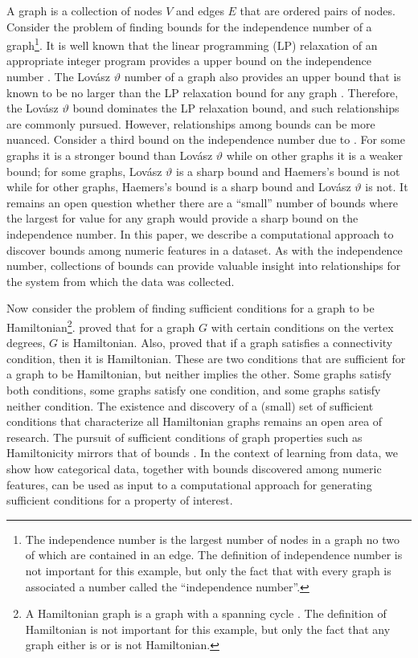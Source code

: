 \documentclass[ijds,nonblindrev]{informs-ijds}
\begin{document}
A graph is a collection of nodes $V$ and edges $E$ that are ordered pairs of nodes.  Consider the problem of finding bounds for the independence number of a graph\footnote{The independence number is the largest number of nodes in a graph no two of which are contained in an edge.  The definition of independence number is not important for this example, but only the fact that with every graph is associated a number called the ``independence number''.}.  It is well known that the linear programming (LP) relaxation of an appropriate integer program provides a upper bound on the independence number \citep{Schr03}.  The Lov\'asz $\vartheta$ number of a graph also provides an upper bound that is known to be no larger than the LP relaxation bound for any graph \citep{Lova79}.  Therefore, the Lov\'asz $\vartheta$ bound dominates the LP relaxation bound, and such relationships are commonly pursued.  However, relationships among bounds can be more nuanced.  Consider a third bound on the independence number due to \citet{Haem79}.  For some graphs it is a stronger bound than Lov\'asz $\vartheta$ while on other graphs it is a weaker bound; for some graphs, Lov\'asz $\vartheta$ is a sharp bound and Haemers's bound is not while for other graphs, Haemers's bound is a sharp bound and Lov\'asz $\vartheta$ is not.  It remains an open question whether there are a ``small'' number of bounds where the largest for value for any graph would provide a sharp bound on the independence number.  In this paper, we describe a computational approach to discover bounds among numeric features in a dataset.  As with the independence number, collections of bounds can provide valuable insight into relationships for the system from which the data was collected.  

Now consider the problem of finding sufficient conditions for a graph to be Hamiltonian\footnote{A Hamiltonian graph is a graph with a spanning cycle \citep{West01}.  The definition of Hamiltonian is not important for this example, but only the fact that any graph either is or is not Hamiltonian.}.  \citet{chvatal:72} proved that for a graph $G$ with certain conditions on the vertex degrees, $G$ is Hamiltonian.  Also, \citet{ChvaErdo72} proved that if a graph satisfies a connectivity condition, then it is Hamiltonian.  These are two conditions that are sufficient for a graph to be Hamiltonian, but neither implies the other.  Some graphs satisfy both conditions, some graphs satisfy one condition, and some graphs satisfy neither condition.  The existence and discovery of a (small) set of sufficient conditions that characterize all Hamiltonian graphs remains an open area of research.  The pursuit of sufficient conditions of graph properties such as Hamiltonicity mirrors that of  bounds \citep{LarsVanc17}.  In the context of learning from data, we show how categorical data, together with bounds discovered among numeric features, can be used as input to a computational approach for generating sufficient conditions for a property of interest. 
\end{document}
